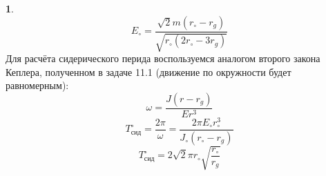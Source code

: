 \documentclass[12pt]{article}
\theoremstyle{definition}
\newtheorem{zad}{}[section]
\begin{document}
\begin{zad}
\begin{equation}
\end{equation}
\begin{equation}
    \boxed{E_\circ=\frac{\sqrt{2}m(r_\circ-r_g)}{\sqrt{r_\circ(2r_\circ-3r_g)}}}
\end{equation}
Для расчёта сидерического перида воспользуемся аналогом второго закона Кеплера, полученном в задаче 11.1 (движение по окружности будет равномерным):
\begin{equation}
    \omega=\frac{J(r-r_g)}{Er^3}
\end{equation}
\begin{equation}
    T^\circ_{сид}=\frac{2\pi}{\omega}=\frac{2\pi E_\circ r_\circ^3}{J_\circ(r_\circ-r_g)}
\end{equation}
\begin{equation}
    \boxed{T^\circ_{сид}=2\sqrt2\pi r_\circ\sqrt{\frac{r_\circ}{r_g}}}
\end{equation}
\end{zad}
\end{document}
